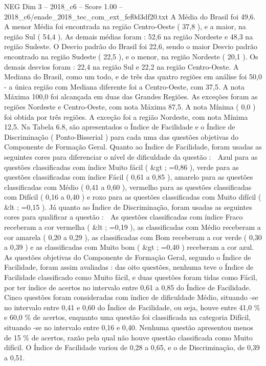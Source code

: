 \begin{textsample}{NEG Dim 3 – 2018\_c6 – Score 1.00 – 2018\_c6/enade\_2018\_tec\_com\_ext\_fef0d3df20.txt}
A Média do Brasil foi 49,6.
A menor Média foi encontrada na região Centro-Oeste ( 37,8 ), e a maior, na região Sul ( 54,4 ).
As demais médias foram : 52,6 na região Nordeste e 48,3 na região Sudeste.
O Desvio padrão do Brasil foi 22,6, sendo o maior Desvio padrão encontrado na região Sudeste ( 22,5 ), e o menor, na região Nordeste ( 20,1 ).
Os demais desvios foram : 22,4 na região Sul e 22,2 na região Centro-Oeste.
A Mediana do Brasil, como um todo, e de três das quatro regiões em análise foi 50,0 - a única região com Mediana diferente foi a Centro-Oeste, com 37,5.
A nota Máxima 100,0 foi alcançada em duas das Grandes Regiões.
As exceções foram as regiões Nordeste e Centro-Oeste, com nota Máxima 87,5.
A nota Mínima ( 0,0 ) foi obtida por três regiões.
A exceção foi a região Nordeste, com nota Mínima 12,5.
Na Tabela 6.8, são apresentados o Índice de Facilidade e o Índice de Discriminação ( Ponto-Bisserial ) para cada uma das questões objetivas do Componente de Formação Geral.
Quanto ao Índice de Facilidade, foram usadas as seguintes cores para diferenciar o nível de dificuldade da questão :  Azul para as questões classificadas com índice Muito fácil ( \&gt ; =0,86 ), verde para as questões classificadas com índice Fácil ( 0,61 a 0,85 ), amarelo para as questões classificadas com Médio ( 0,41 a 0,60 ), vermelho para as questões classificadas com Difícil ( 0,16 a 0,40 ) e roxo para as questões classificadas com Muito difícil ( \&lt ; =0,15 ).
Já quanto ao Índice de Discriminação, foram usadas as seguintes cores para qualificar a questão :  As questões classificadas com índice Fraco receberam a cor vermelha ( \&lt ; =0,19 ), as classificadas com Médio receberam a cor amarela ( 0,20 a 0,29 ), as classificadas com Bom receberam a cor verde ( 0,30 a 0,39 ) e as classificadas com Muito bom ( \&gt ; =0,40 ) receberam a cor azul.
As questões objetivas do Componente de Formação Geral, segundo o Índice de Facilidade, foram assim avaliadas : das oito questões, nenhuma teve o Índice de Facilidade classificado como Muito fácil, e duas questões foram tidas como Fácil, por ter índice de acertos no intervalo entre 0,61 a 0,85 do Índice de Facilidade.
Cinco questões foram consideradas com índice de dificuldade Médio, situando -se no intervalo entre 0,41 e 0,60 do Índice de Facilidade, ou seja, houve entre 41,0 \% e 60,0 \% de acertos, enquanto uma questão foi classificada na categoria Difícil, situando -se no intervalo entre 0,16 e 0,40.
Nenhuma questão apresentou menos de 15 \% de acertos, razão pela qual não houve questão classificada como Muito difícil.
O Índice de Facilidade variou de 0,28 a 0,65, e o de Discriminação, de 0,39 a 0,51.

\end{textsample}
